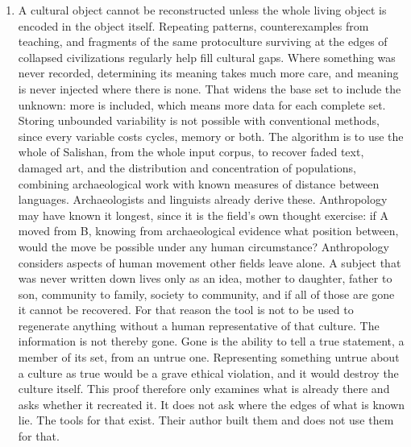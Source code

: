 \begin{enumerate}
\item A cultural object cannot be reconstructed unless the whole living object is encoded in the object
itself. Repeating patterns, counterexamples from teaching, and fragments of the same protoculture
surviving at the edges of collapsed civilizations regularly help fill cultural gaps. Where something
was never recorded, determining its meaning takes much more care, and meaning is never injected where
there is none. That widens the base set to include the unknown: more is included, which means more
data for each complete set. Storing unbounded variability is not possible with conventional methods,
since every variable costs cycles, memory or both. The algorithm is to use the whole of Salishan, from
the whole input corpus, to recover faded text, damaged art, and the distribution and concentration of
populations, combining archaeological work with known measures of distance between languages.
Archaeologists and linguists already derive these. Anthropology may have known it longest, since it is
the field's own thought exercise: if A moved from B, knowing from archaeological evidence what position
between, would the move be possible under any human circumstance? Anthropology considers aspects of
human movement other fields leave alone. A subject that was never written down lives only as an idea,
mother to daughter, father to son, community to family, society to community, and if all of those are
gone it cannot be recovered. For that reason the tool is not to be used to regenerate anything without
a human representative of that culture. The information is not thereby gone. Gone is the ability
to tell a true statement, a member of its set, from an untrue one. Representing something untrue
about a culture as true would be a grave ethical violation, and it would destroy the culture itself.
This proof therefore only examines what is already there and asks whether it recreated it. It does not
ask where the edges of what is known lie. The tools for that exist. Their author built them and does
not use them for that.
\end{enumerate}

